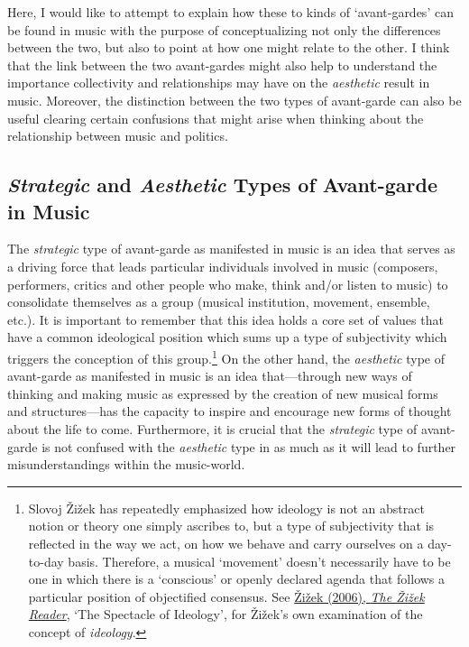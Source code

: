 Here, I would like to attempt to explain how these to kinds of `avant-gardes' can be found in music with the purpose of conceptualizing not only the differences between the two, but also to point at how one might relate to the other. I think that the link between the two avant-gardes might also help to understand the importance collectivity and relationships may have on the \emph{aesthetic} result in music. Moreover, the distinction between the two types of avant-garde can also be useful clearing certain confusions that might arise when thinking about the relationship between music and politics.  

\subsection{\emph{Strategic} and \emph{Aesthetic} Types of Avant-garde in Music}

The \emph{strategic} type of avant-garde as manifested in music is an idea that serves as a driving force that leads particular individuals involved in music (composers, performers, critics and other people who make, think and/or listen to music) to consolidate themselves as a group (musical institution, movement, ensemble, etc.). It is important to remember that this idea holds a core set of values that have a common ideological position which sums up a type of subjectivity which triggers the conception of this group.\footnote{Slovoj \v{Z}i\v{z}ek has repeatedly emphasized how ideology is not an abstract notion or theory one simply ascribes to, but a type of subjectivity that is reflected in the way we act, on how we behave and carry ourselves on a day-to-day basis. Therefore, a musical `movement' doesn't necessarily have to be one in which there is a `conscious' or openly declared agenda that follows a particular position of objectified consensus. See \hyperlink{zizekreader}{\v{Z}i\v{z}ek (2006), \emph{The \v{Z}i\v{z}ek Reader}}, `The Spectacle of Ideology', for \v{Z}i\v{z}ek's own examination of the concept of \emph{ideology}.} On the other hand,  the \emph{aesthetic} type of avant-garde as manifested in music is an idea that---through new ways of thinking and making music as expressed by the creation of new musical forms and structures---has the capacity to inspire and encourage new forms of thought about the life to come.  Furthermore, it is crucial that the \emph{strategic} type of avant-garde is not confused with the \emph{aesthetic} type in as much as it will lead to further misunderstandings within the music-world. 


